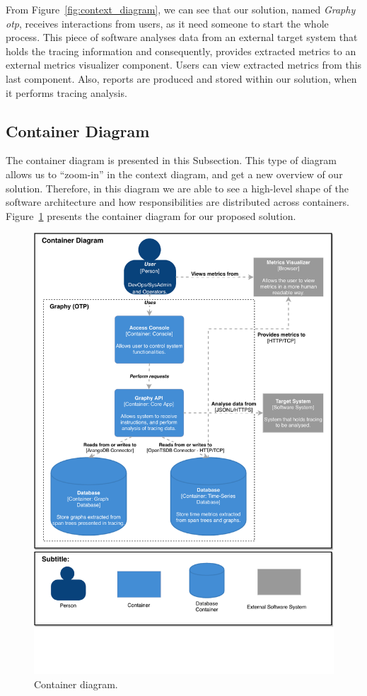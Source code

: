 From Figure~\ref{fig:context_diagram}, we can see that our solution, named \emph{Graphy \gls{otp}}, receives interactions from users, as it need someone to start the whole process. This piece of software analyses data from an external target system that holds the tracing information and consequently, provides extracted metrics to an external metrics visualizer component. Users can view extracted metrics from this last component. Also, reports are produced and stored within our solution, when it performs tracing analysis.

\subsection{Container Diagram}
\label{subsec:container_diagram}

The container diagram is presented in this Subsection. This type of diagram allows us to ``zoom-in'' in the context diagram, and get a new overview of our solution. Therefore, in this diagram we are able to see a high-level shape of the software architecture and how responsibilities are distributed across containers. Figure~\ref{fig:container_diagram} presents the container diagram for our proposed solution.

\begin{figure}[H]
    \centering
    \includegraphics[width=1.00\textwidth]{images/container_diagram.pdf}
    \caption{Container diagram.}
    \label{fig:container_diagram}
\end{figure}


